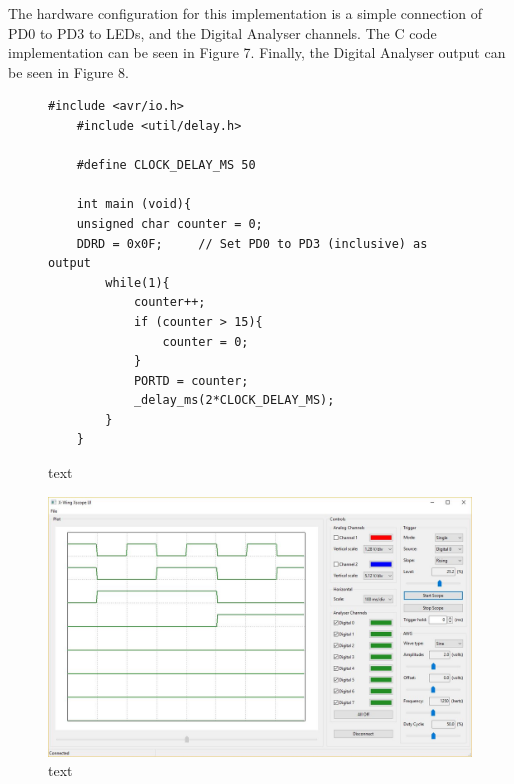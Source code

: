 \documentclass[a4paper]{article}
\begin{document}
The hardware configuration for this implementation is a simple connection of PD0 to PD3 to LEDs, and the Digital Analyser channels. The C code implementation can be seen in Figure 7. Finally, the Digital Analyser output can be seen in Figure 8.
\begin{figure}[h]
	\begin{lstlisting}[style=CStyle]
	#include <avr/io.h>
	#include <util/delay.h>
	
	#define CLOCK_DELAY_MS 50
	
	int main (void){
	unsigned char counter = 0;
	DDRD = 0x0F;     // Set PD0 to PD3 (inclusive) as output
		while(1){
			counter++;
			if (counter > 15){
				counter = 0;
			}
			PORTD = counter;
			_delay_ms(2*CLOCK_DELAY_MS);
		}
	}
	\end{lstlisting}
	\caption{text}
\end{figure}

\begin{figure}[h]
	\centering
	\includegraphics[scale=0.45]{fig6}
	\caption{text}
\end{figure}
\end{document}
